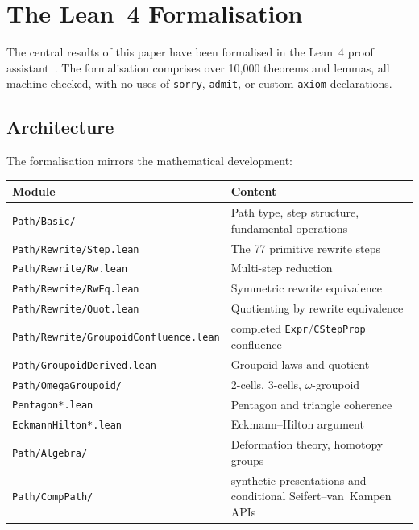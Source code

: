 \documentclass[manuscript]{BSLstyle}
\begin{document}
\section{The Lean~4 Formalisation}\label{sec:formalization}

The central results of this paper have been formalised in the Lean~4
proof assistant~\cite{deMoura2021}.  The formalisation comprises over
10{,}000 theorems and lemmas, all machine-checked, with no uses of
\texttt{sorry}, \texttt{admit}, or custom \texttt{axiom} declarations.

\subsection{Architecture}

The formalisation mirrors the mathematical development:

\begin{center}
\small
\begin{tabular}{lp{5.8cm}}
\toprule
\textbf{Module} & \textbf{Content} \\
\midrule
\texttt{Path/Basic/} & Path type, step structure, fundamental operations \\
\texttt{Path/Rewrite/Step.lean} & The 77 primitive rewrite steps \\
\texttt{Path/Rewrite/Rw.lean} & Multi-step reduction \\
\texttt{Path/Rewrite/RwEq.lean} & Symmetric rewrite equivalence \\
\texttt{Path/Rewrite/Quot.lean} & Quotienting by rewrite equivalence \\
\texttt{Path/Rewrite/GroupoidConfluence.lean} & completed \texttt{Expr}/\texttt{CStepProp} confluence \\
\texttt{Path/GroupoidDerived.lean} & Groupoid laws and quotient \\
\texttt{Path/OmegaGroupoid/} & 2-cells, 3-cells, $\omega$-groupoid \\
\texttt{Pentagon*.lean} & Pentagon and triangle coherence \\
\texttt{EckmannHilton*.lean} & Eckmann--Hilton argument \\
\texttt{Path/Algebra/} & Deformation theory, homotopy groups \\
\texttt{Path/CompPath/} & synthetic presentations and conditional Seifert--van~Kampen APIs \\
\bottomrule
\end{tabular}
\end{center}
\end{document}

